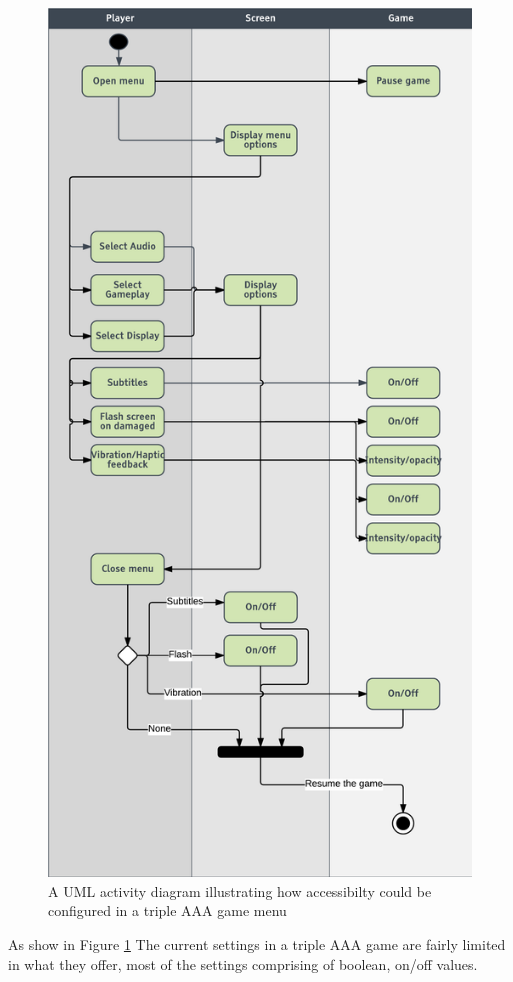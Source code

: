 \documentclass{scrartcl}
\begin{document}
\begin{figure}
\centering
\includegraphics [scale=0.4]{image}
\caption{A UML activity diagram illustrating how accessibilty could be configured in a triple AAA game menu}
\label{fig:image}
\end{figure}
As show in Figure \ref{fig:image} The current settings in a triple AAA game are fairly limited in what they offer, most of the settings comprising of boolean, on/off values.
\end{document}
